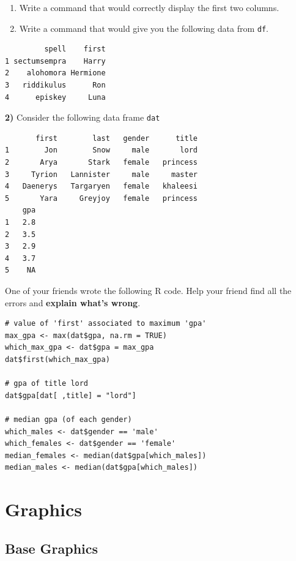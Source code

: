 \documentclass[
]{book}
\begin{document}
\begin{enumerate}
\def\labelenumi{\alph{enumi})}
\setcounter{enumi}{3}
\item
  Write a command that would correctly display the first two columns.
\item
  Write a command that would give you the following data from \texttt{df}.
\end{enumerate}

\begin{verbatim}
         spell    first
1 sectumsempra    Harry
2    alohomora Hermione
3   riddikulus      Ron
4      episkey     Luna
\end{verbatim}

\textbf{2)} Consider the following data frame \texttt{dat}

\begin{verbatim}
       first        last   gender      title
1        Jon        Snow     male       lord
2       Arya       Stark   female   princess
3     Tyrion   Lannister     male     master
4   Daenerys   Targaryen   female   khaleesi
5       Yara     Greyjoy   female   princess
    gpa
1   2.8
2   3.5
3   2.9
4   3.7
5    NA
\end{verbatim}

One of your friends wrote the following R code. Help your friend find all the
errors and \textbf{explain what's wrong}.

\begin{verbatim}
# value of 'first' associated to maximum 'gpa'
max_gpa <- max(dat$gpa, na.rm = TRUE)
which_max_gpa <- dat$gpa = max_gpa
dat$first(which_max_gpa)

# gpa of title lord
dat$gpa[dat[ ,title] = "lord"]

# median gpa (of each gender)
which_males <- dat$gender == 'male'
which_females <- dat$gender == 'female'
median_females <- median(dat$gpa[which_males])
median_males <- median(dat$gpa[which_males])
\end{verbatim}

\hypertarget{part-graphics}{%
\part{Graphics}\label{part-graphics}}

\hypertarget{graphics1}{%
\chapter{Base Graphics}\label{graphics1}}
\end{document}
